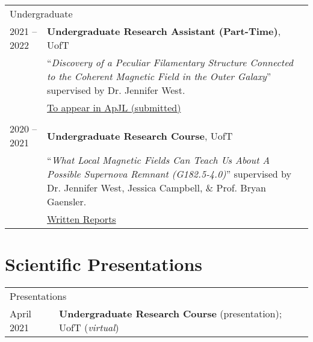 \documentclass[10pt]{res} %
\begin{document}
\begin{resume}
\begin{table}[h!]
\begin{tabularx}{\textwidth}{ @{} p{6.5em} X @{} }
\multicolumn{2}{l}{ \rule{0pt}{3ex} \large \hspace{-12pt} Undergraduate \dotfill \rule[-1.2ex]{0pt}{0pt}} \\ 
2021 -- 2022 & \textbf{Undergraduate Research Assistant (Part-Time)}, UofT \\
                     & ``\textit{Discovery of a Peculiar Filamentary Structure Connected to the Coherent Magnetic Field in the Outer Galaxy}'' supervised by Dr. Jennifer West. \\
                     & \href{https://ui.adsabs.harvard.edu/abs/2022arXiv221010098W/abstract}{To appear in ApJL (submitted)} \\ \\
2020 -- 2021 & \textbf{Undergraduate Research Course}, UofT \\
                     & ``\textit{What Local Magnetic Fields Can Teach Us About A Possible Supernova Remnant (G182.5-4.0)}'' supervised by Dr. Jennifer West, Jessica Campbell, $\&$ Prof. Bryan Gaensler. \\
                     & \href{https://github.com/parampreetastro/AST425}{Written Reports}
\end{tabularx}
\end{table}



\section{\Large Scientific Presentations}
\vspace{-5pt} %
\noindent\makebox[\linewidth]{\rule{\textwidth}{0.4pt}}
\vspace{-20pt} %

\begin{table}[h!]
\begin{tabularx}{\textwidth}{lX}
\multicolumn{2}{l}{ \rule{0pt}{3ex} \large \hspace{-12pt} Presentations \dotfill \rule[-1.2ex]{0pt}{0pt}} \\
April 2021 & \textbf{Undergraduate Research Course} (presentation); UofT (\textit{virtual})
\end{tabularx}


\end{table}
\end{resume}
\end{document}
